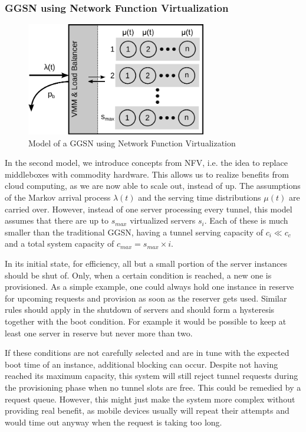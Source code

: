 \subsubsection{\texorpdfstring{\acrshort{GGSN}}{GGSN} using Network Function Virtualization}
\label{c4:sec:virtual_ggsn}

\begin{figure}[htb]
  \centering
  \includegraphics[width=0.7\textwidth]{images/ggsn-virtualized.pdf}
  \caption{Model of a GGSN using Network Function Virtualization}
  \label{c4:fig:model_nfv_ggsn}
\end{figure}

In the second model, we introduce concepts from \gls{NFV}, i.e. the idea to replace middleboxes with commodity hardware. This allows us to realize benefits from cloud computing, as we are now able to scale out, instead of up. The assumptions of the Markov arrival process $\lambda(t)$ and the serving time distributions $\mu(t)$ are carried over. However, instead of one server processing every tunnel, this model assumes that there are up to $s_{max}$ virtualized servers $s_i$. Each of these is much smaller than the traditional GGSN, having a tunnel serving capacity of $c_i \ll c_c$ and a total system capacity of $c_{max} = s_{max} \times i$.

In its initial state, for efficiency, all but a small portion of the server instances should be shut of. Only, when a certain condition is reached, a new one is provisioned. As a simple example, one could always hold one instance in reserve for upcoming requests and provision as soon as the reserver gets used. Similar rules should apply in the shutdown of servers and should form a hysteresis together with the boot condition. For example it would be possible to keep at least one server in reserve but never more than two.

If these conditions are not carefully selected and are in tune with the expected boot time of an instance, additional blocking can occur. Despite not having reached its maximum capacity, this system will still reject tunnel requests during the provisioning phase when no tunnel slots are free. This could be remedied by a request queue. However, this might just make the system more complex without providing real benefit, as mobile devices usually will repeat their attempts and would time out anyway when the request is taking too long. 

